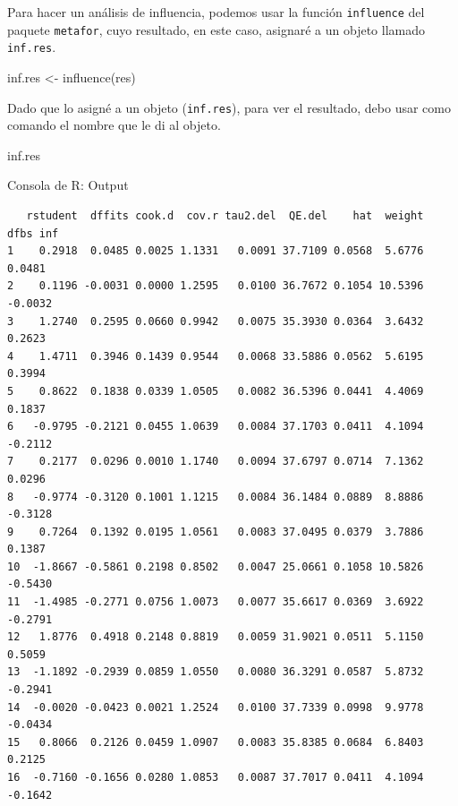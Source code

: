\documentclass[
  bookmarksnumbered]{article}
\newenvironment{Shaded}{\begin{snugshade}}{\end{snugshade}}
\newcommand{\FunctionTok}[1]{\textcolor[rgb]{0.39,0.29,0.61}{#1}}
\newcommand{\NormalTok}[1]{\textcolor[rgb]{0.12,0.11,0.11}{#1}}
\newcommand{\OtherTok}[1]{\textcolor[rgb]{0.00,0.43,0.16}{#1}}
\begin{document}
Para hacer un análisis de influencia, podemos usar la función \texttt{influence} del paquete \texttt{metafor}, cuyo resultado, en este caso, asignaré a un objeto llamado \texttt{inf.res}.

\begin{Shaded}
\begin{Highlighting}[]
\NormalTok{inf.res }\OtherTok{\textless{}{-}} \FunctionTok{influence}\NormalTok{(res)}
\end{Highlighting}
\end{Shaded}

Dado que lo asigné a un objeto (\texttt{inf.res}), para ver el resultado, debo usar como comando el nombre que le di al objeto.

\begin{Shaded}
\begin{Highlighting}[]
\NormalTok{inf.res}
\end{Highlighting}
\end{Shaded}

\begin{ROut}{Consola de R: Output~\thetcbcounter}
                \begin{footnotesize}
                \begin{verbatim} 
   rstudent  dffits cook.d  cov.r tau2.del  QE.del    hat  weight    dfbs inf 
1    0.2918  0.0485 0.0025 1.1331   0.0091 37.7109 0.0568  5.6776  0.0481     
2    0.1196 -0.0031 0.0000 1.2595   0.0100 36.7672 0.1054 10.5396 -0.0032     
3    1.2740  0.2595 0.0660 0.9942   0.0075 35.3930 0.0364  3.6432  0.2623     
4    1.4711  0.3946 0.1439 0.9544   0.0068 33.5886 0.0562  5.6195  0.3994     
5    0.8622  0.1838 0.0339 1.0505   0.0082 36.5396 0.0441  4.4069  0.1837     
6   -0.9795 -0.2121 0.0455 1.0639   0.0084 37.1703 0.0411  4.1094 -0.2112     
7    0.2177  0.0296 0.0010 1.1740   0.0094 37.6797 0.0714  7.1362  0.0296     
8   -0.9774 -0.3120 0.1001 1.1215   0.0084 36.1484 0.0889  8.8886 -0.3128     
9    0.7264  0.1392 0.0195 1.0561   0.0083 37.0495 0.0379  3.7886  0.1387     
10  -1.8667 -0.5861 0.2198 0.8502   0.0047 25.0661 0.1058 10.5826 -0.5430     
11  -1.4985 -0.2771 0.0756 1.0073   0.0077 35.6617 0.0369  3.6922 -0.2791     
12   1.8776  0.4918 0.2148 0.8819   0.0059 31.9021 0.0511  5.1150  0.5059     
13  -1.1892 -0.2939 0.0859 1.0550   0.0080 36.3291 0.0587  5.8732 -0.2941     
14  -0.0020 -0.0423 0.0021 1.2524   0.0100 37.7339 0.0998  9.9778 -0.0434     
15   0.8066  0.2126 0.0459 1.0907   0.0083 35.8385 0.0684  6.8403  0.2125     
16  -0.7160 -0.1656 0.0280 1.0853   0.0087 37.7017 0.0411  4.1094 -0.1642     
 \end{verbatim}
                \end{footnotesize}
                \end{ROut}
\end{document}
